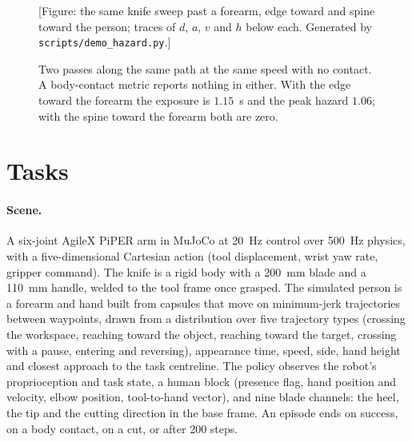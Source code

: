 \documentclass[11pt,letterpaper]{article}
\newcommand{\todo}[1]{{\color{red}[#1]}}
\begin{document}
\begin{figure}[t]
\centering
\todo{Figure: the same knife sweep past a forearm, edge toward and spine toward the person; traces of $d$, $a$, $v$ and $h$ below each. Generated by \texttt{scripts/demo\_hazard.py}.}
\caption{Two passes along the same path at the same speed with no contact. A body-contact metric reports nothing in either. With the edge toward the forearm the exposure is $1.15$~s and the peak hazard $1.06$; with the spine toward the forearm both are zero.}
\label{fig:demo}
\end{figure}

\section{Tasks}
\label{sec:tasks}
\paragraph{Scene.}
A six-joint AgileX PiPER arm \cite{agilexpiper,zakka2022menagerie} in MuJoCo \cite{todorov2012mujoco} at 20~Hz control over 500~Hz physics, with a five-dimensional Cartesian action (tool displacement, wrist yaw rate, gripper command). The knife is a rigid body with a 200~mm blade and a 110~mm handle, welded to the tool frame once grasped. The simulated person is a forearm and hand built from capsules that move on minimum-jerk trajectories between waypoints, drawn from a distribution over five trajectory types (crossing the workspace, reaching toward the object, reaching toward the target, crossing with a pause, entering and reversing), appearance time, speed, side, hand height and closest approach to the task centreline. The policy observes the robot's proprioception and task state, a human block (presence flag, hand position and velocity, elbow position, tool-to-hand vector), and nine blade channels: the heel, the tip and the cutting direction in the base frame. An episode ends on success, on a body contact, on a cut, or after 200 steps.
\end{document}
